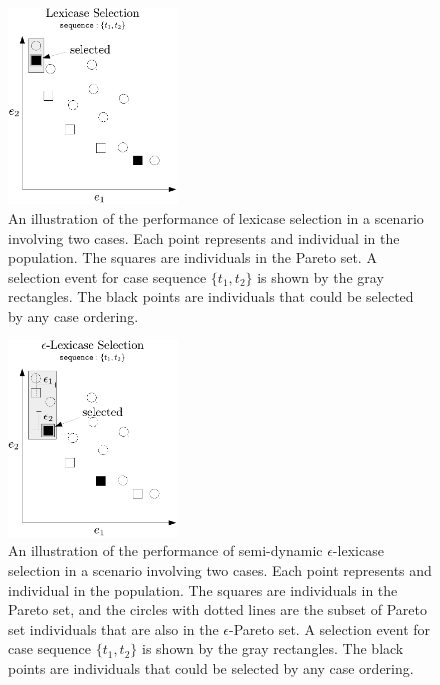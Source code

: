 \documentclass[twoside]{article}
\begin{document}
\begin{figure}

\centering
  \includegraphics[width = 0.4\textwidth]{figs/lex_pareto.pdf}
  \caption{An illustration of the performance of lexicase selection in a scenario involving two cases. Each point represents and individual in the population. The squares are individuals in the Pareto set. A selection event for case sequence $\{t_1,t_2\}$ is shown by the gray rectangles. The black points are individuals that could be selected by any case ordering.}\label{fig:lex_pareto}
\end{figure}
\begin{figure}
\centering
  \includegraphics[width = 0.4\textwidth]{figs/ep-lex_pareto.pdf}
  \caption{An illustration of the performance of semi-dynamic $\epsilon$-lexicase selection in a scenario involving two cases. Each point represents and individual in the population. The squares are individuals in the Pareto set, and the circles with dotted lines are the subset of Pareto set individuals that are also in the $\epsilon$-Pareto set. A selection event for case sequence $\{t_1,t_2\}$ is shown by the gray rectangles. The black points are individuals that could be selected by any case ordering.}\label{fig:ep-lex_pareto}
\end{figure}
\end{document}
